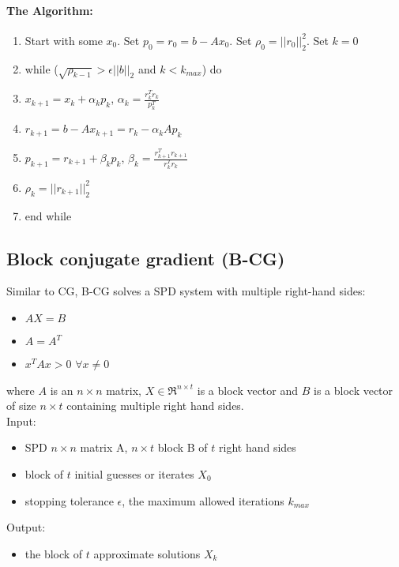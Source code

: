 \documentclass[]{scrartcl}
\begin{document}
\paragraph{The Algorithm:}
\begin{enumerate}
	\item Start with some $x_{0}$. Set $p_{0}=r_{0}=b-Ax_{0}$. Set $\rho_{0}=||r_{0}||_{2}^{2}$. Set $k=0$
	\item while ($\sqrt{\rho_{k-1}} > \epsilon ||b||_{2}$ and $k<k_{max}$) do
	\item \qquad $x_{k+1}=x_{k}+\alpha_{k}p_{k}$, $\alpha_{k}=\frac{r_{k}^{T}r_{k}}{p^{T}_{k}}$
	\item \qquad $r_{k+1}=b-Ax_{k+1}=r_{k}-\alpha_{k}Ap_{k}$
	\item \qquad $p_{k+1}=r_{k+1}+\beta_{k}p_{k}$, $\beta_{k}=\frac{r^{T}_{k+1}r_{k+1}}{r^{T}_{k}r_{k}}$
	\item \qquad $\rho_{k}=||r_{k+1}||_{2}^{2}$
	\item end while
\end{enumerate}
\subsection{Block conjugate gradient (B-CG)}
Similar to CG, B-CG solves a SPD system with multiple right-hand sides:
\begin{itemize}
	\item $AX=B$
	\item $A=A^{T}$
	\item $x^{T}Ax>0$ $\forall x \neq 0$
\end{itemize}
where $A$ is an $n\times n$ matrix, $X \in \Re^{n\times t}$ is a block vector and $B$ is a block vector of size $n\times t$ containing multiple right hand sides. \\
Input: 
\begin{itemize}
	\item SPD $n\times n$ matrix A, $n\times t$ block B of $t$ right hand sides
	\item block of $t$ initial guesses or iterates $X_{0}$
	\item stopping tolerance $\epsilon$, the maximum allowed iterations $k_{max}$ 
\end{itemize}
Output:
\begin{itemize}
	\item the block of $t$ approximate solutions $X_{k}$ 
\end{itemize}
\end{document}
